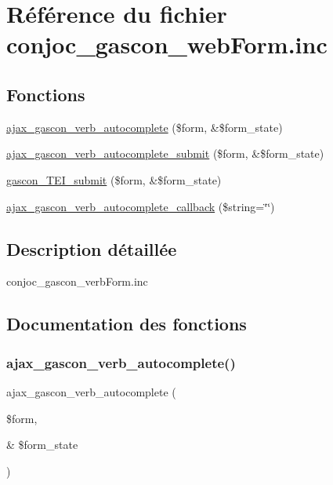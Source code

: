 \hypertarget{conjoc__gascon__web_form_8inc}{}\section{Référence du fichier conjoc\+\_\+gascon\+\_\+web\+Form.\+inc}
\label{conjoc__gascon__web_form_8inc}
\subsection*{Fonctions}
\begin{DoxyCompactItemize}
\item 
\hyperlink{conjoc__gascon__web_form_8inc_a28516e435edf21d85ed77091d71f5d6b}{ajax\+\_\+gascon\+\_\+verb\+\_\+autocomplete} (\$form, \&\$form\+\_\+state)
\item 
\hyperlink{conjoc__gascon__web_form_8inc_a332dbb7ab0a2190165164326af8cc7f1}{ajax\+\_\+gascon\+\_\+verb\+\_\+autocomplete\+\_\+submit} (\$form, \&\$form\+\_\+state)
\item 
\hyperlink{conjoc__gascon__web_form_8inc_aeae9bd30b3fa7e4a9edf10587db73c23}{gascon\+\_\+\+T\+E\+I\+\_\+submit} (\$form, \&\$form\+\_\+state)
\item 
\hyperlink{conjoc__gascon__web_form_8inc_a1be8e9edb4dcdb19c5b5bb88b48c5980}{ajax\+\_\+gascon\+\_\+verb\+\_\+autocomplete\+\_\+callback} (\$string=\char`\"{}\char`\"{})
\end{DoxyCompactItemize}


\subsection{Description détaillée}
conjoc\+\_\+gascon\+\_\+verb\+Form.\+inc 

\subsection{Documentation des fonctions}
\hypertarget{conjoc__gascon__web_form_8inc_a28516e435edf21d85ed77091d71f5d6b}{}\label{conjoc__gascon__web_form_8inc_a28516e435edf21d85ed77091d71f5d6b} 
\subsubsection{\texorpdfstring{ajax\+\_\+gascon\+\_\+verb\+\_\+autocomplete()}{ajax\_gascon\_verb\_autocomplete()}}
{\footnotesize\ttfamily ajax\+\_\+gascon\+\_\+verb\+\_\+autocomplete (\begin{DoxyParamCaption}\item[{}]{\$form,  }\item[{\&}]{\$form\+\_\+state }\end{DoxyParamCaption})}

